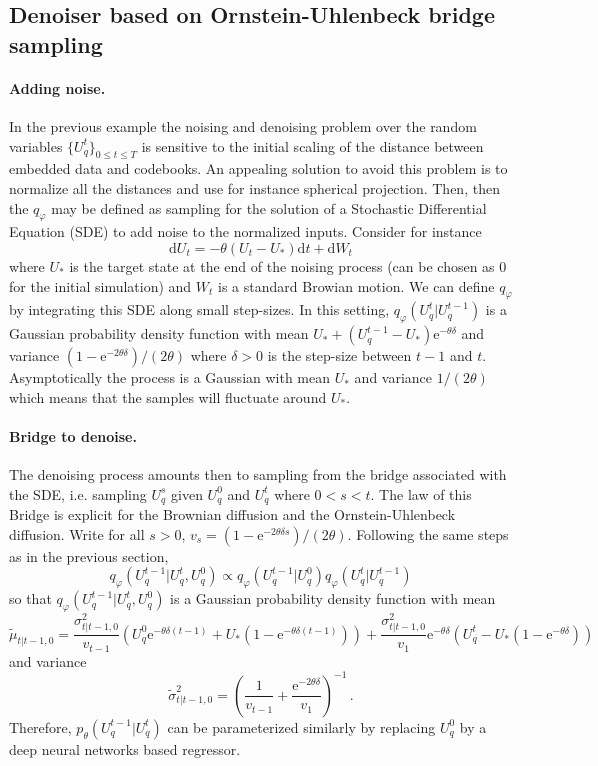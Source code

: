 \documentclass{article}
\begin{document}
\subsection{Denoiser based on Ornstein-Uhlenbeck bridge sampling}
\paragraph{Adding noise. }
In the previous example the noising and denoising problem over the random variables $\{U_q^t\}_{0\leqslant t\leqslant T}$ is sensitive to the initial scaling of the distance between embedded data and codebooks. An appealing solution to avoid this problem is to normalize all the distances and use for instance spherical projection. Then, then the $q_\varphi$ may  be defined as sampling for the solution of a Stochastic Differential Equation (SDE) to add noise to the  normalized inputs. Consider for instance 
$$
\mathrm{d}U_t = -\theta (U_t - U_*)\mathrm{d}t + \mathrm{d}W_t
$$
where $U_*$ is the target state at the end of the noising process (can be chosen as 0 for the initial simulation) and $W_t$ is a standard Browian motion. We can define $q_\varphi$ by integrating this SDE along small step-sizes. In this setting, $q_\varphi(U_q^{t}|U_q^{t-1})$ is a Gaussian probability density function with mean $U_* + (U_q^{t-1}-U_*)\mathrm{e}^{-\theta \delta}$ and variance $(1-\mathrm{e}^{-2\theta\delta})/(2\theta)$ where $\delta>0$ is the step-size between $t-1$ and $t$. Asymptotically the process is a Gaussian with mean $U_*$ and variance $1/(2\theta)$ which means that the samples will fluctuate around $U_*$.

\paragraph{Bridge to denoise. }
The denoising process amounts then to sampling from the bridge associated with the SDE, i.e. sampling $U_q^s$ given $U_q^0$ and $U_q^t$ where $0<s<t$. The law of this Bridge is explicit for the Brownian diffusion and the Ornstein-Uhlenbeck diffusion. Write for all $s>0$, $v_s = (1-\mathrm{e}^{-2\theta\delta s})/(2\theta)$.
Following the same steps as in the previous section, 
$$
q_\varphi(U_q^{t-1}|U_q^{t},U_q^{0}) \propto q_\varphi(U_q^{t-1}|U_q^{0}) q_\varphi(U_q^{t}|U_q^{t-1})
$$
so that $q_\varphi(U_q^{t-1}|U_q^{t},U_q^{0})$ is a Gaussian probability density function with mean 
$$
\tilde \mu_{t|t-1,0} = \frac{\sigma^2_{t|t-1,0}}{v_{t-1}}\left(U_q^0\mathrm{e}^{-\theta\delta(t-1)} +U_*(1-\mathrm{e}^{-\theta\delta(t-1)})\right) + \frac{\sigma^2_{t|t-1,0}}{v_{1}}\mathrm{e}^{-\theta\delta}\left(U_q^t - U_*(1 - \mathrm{e}^{-\theta\delta} )\right)
$$
and variance
$$
\tilde \sigma^2_{t|t-1,0} = \left(\frac{1}{v_{t-1}} + \frac{\mathrm{e}^{-2\theta\delta}}{v_1}\right)^{-1}\,.
$$
 Therefore, $p_\theta(U_q^{t-1}|U_q^t)$ can be parameterized similarly by replacing $U_q^0$ by a deep neural networks based regressor.
\end{document}
